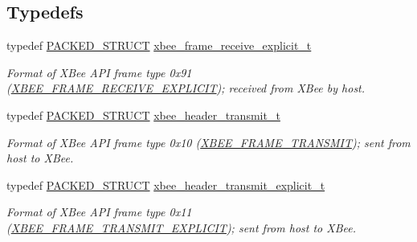 \subsection*{Typedefs}
\begin{DoxyCompactItemize}
\item 
typedef \hyperlink{group___s_x_a_ga4233297bd31be5c273d4fb0758cc54d7}{P\-A\-C\-K\-E\-D\-\_\-\-S\-T\-R\-U\-C\-T} \hyperlink{group__xbee__wpan_gad36b64f2e729281d8b7704f6e9906e82}{xbee\-\_\-frame\-\_\-receive\-\_\-explicit\-\_\-t}
\begin{DoxyCompactList}\small\item\em Format of X\-Bee A\-P\-I frame type 0x91 (\hyperlink{group__xbee__device_gga7753bbebaf00d6d64942f64b6ae9b7b9a8f80b5fa338b8bf34888ffcbfd260a54}{X\-B\-E\-E\-\_\-\-F\-R\-A\-M\-E\-\_\-\-R\-E\-C\-E\-I\-V\-E\-\_\-\-E\-X\-P\-L\-I\-C\-I\-T}); received from X\-Bee by host. \end{DoxyCompactList}\item 
typedef \hyperlink{group___s_x_a_ga4233297bd31be5c273d4fb0758cc54d7}{P\-A\-C\-K\-E\-D\-\_\-\-S\-T\-R\-U\-C\-T} \hyperlink{group__xbee__wpan_ga02e02911588cbafc0befb9b9da8961e6}{xbee\-\_\-header\-\_\-transmit\-\_\-t}
\begin{DoxyCompactList}\small\item\em Format of X\-Bee A\-P\-I frame type 0x10 (\hyperlink{group__xbee__device_gga7753bbebaf00d6d64942f64b6ae9b7b9a5215c258e8db6c292b9e52ca26011ed1}{X\-B\-E\-E\-\_\-\-F\-R\-A\-M\-E\-\_\-\-T\-R\-A\-N\-S\-M\-I\-T}); sent from host to X\-Bee. \end{DoxyCompactList}\item 
typedef \hyperlink{group___s_x_a_ga4233297bd31be5c273d4fb0758cc54d7}{P\-A\-C\-K\-E\-D\-\_\-\-S\-T\-R\-U\-C\-T} \hyperlink{group__xbee__wpan_gac2df4f67492506916726d8002ca5f2bd}{xbee\-\_\-header\-\_\-transmit\-\_\-explicit\-\_\-t}
\begin{DoxyCompactList}\small\item\em Format of X\-Bee A\-P\-I frame type 0x11 (\hyperlink{group__xbee__device_gga7753bbebaf00d6d64942f64b6ae9b7b9aa673474f9f3597929def38ad4cf7d63e}{X\-B\-E\-E\-\_\-\-F\-R\-A\-M\-E\-\_\-\-T\-R\-A\-N\-S\-M\-I\-T\-\_\-\-E\-X\-P\-L\-I\-C\-I\-T}); sent from host to X\-Bee. \end{DoxyCompactList}\end{DoxyCompactItemize}
